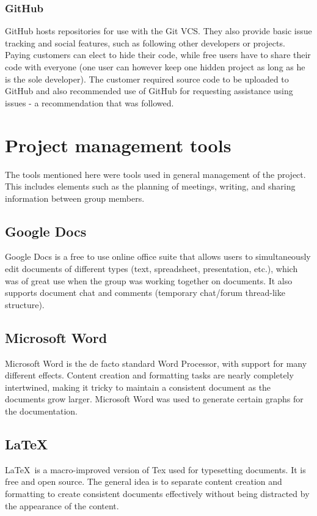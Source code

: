 \subsubsection{GitHub}
\label{sec:GitHub}
GitHub hosts repositories for use with the Git VCS. They also provide basic issue tracking and social features, such as following other developers or projects. Paying customers can elect to hide their code, while free users have to share their code with everyone (one user can however keep one hidden project as long as he is the sole developer). The customer required source code to be uploaded to GitHub and also recommended use of GitHub for requesting assistance using issues - a recommendation that was followed.

\section{Project management tools}
The tools mentioned here were tools used in general management of the project. This includes elements such as the planning of meetings, writing, and sharing information between group members.

\subsection{Google Docs}
Google Docs is a free to use online office suite that allows users to simultaneously edit documents of different types (text, spreadsheet, presentation, etc.), which was of great use when the group was working together on documents. It also supports document chat and comments (temporary chat/forum thread-like structure).

\subsection{Microsoft Word}
Microsoft Word is the de facto standard Word Processor, with support for many different effects. Content creation and formatting tasks are nearly completely intertwined, making it tricky to maintain a consistent document as the documents grow larger. Microsoft Word was used to generate certain graphs for the documentation.

\subsection{\LaTeX}
\LaTeX ~is a macro-improved version of Tex used for typesetting documents. It is free and open source. The general idea is to separate content creation and formatting to create consistent documents effectively without being distracted by the appearance of the content.


